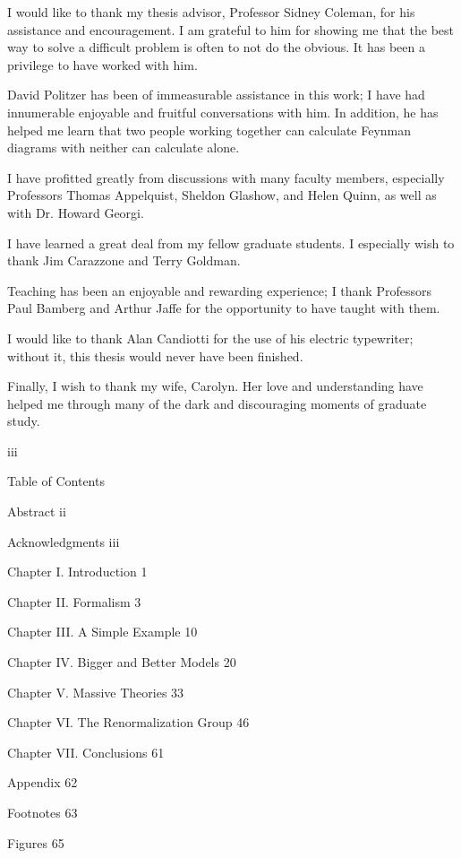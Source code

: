 \documentclass[12pt,epsf]{report}
\begin{document}
\bigskip


I would like to thank my thesis advisor, Professor Sidney Coleman, for
his assistance and encouragement.  I am grateful to him for showing 
me that the best way to solve a difficult problem is often to not do
the obvious.  It has been a privilege to have worked with him.

David Politzer has been of immeasurable assistance in this work; I have 
had innumerable enjoyable and fruitful conversations with him.  In 
addition, he has helped me learn that two people working together 
can calculate Feynman diagrams with neither can calculate alone.

I have profitted greatly from discussions with many faculty members,
especially Professors Thomas Appelquist, Sheldon Glashow, and Helen
Quinn, as well as with Dr. Howard Georgi.

I have learned a great deal from my fellow graduate students.  I 
especially wish to thank Jim Carazzone and Terry Goldman.  

Teaching has been an enjoyable and rewarding experience;
I thank Professors Paul Bamberg and Arthur Jaffe for the opportunity
to have taught with them.

I would like to thank Alan Candiotti for the use of his electric
typewriter; without it, this thesis would never have been finished.

Finally, I wish to thank my wife, Carolyn.  Her love and understanding
have helped me through many of the dark and discouraging moments of 
graduate study.

\thispagestyle{empty}

\vfill \centerline{iii}
\eject

\centerline{Table of Contents}

\bigskip

{\parindent =0pt
Abstract  \hfill  ii

Acknowledgments \hfill  iii 

Chapter I. Introduction  \hfill 1

Chapter II. Formalism \hfill 3

Chapter III. A Simple Example \hfill 10

Chapter IV. Bigger and Better Models \hfill 20

Chapter V. Massive Theories \hfill 33

Chapter VI. The Renormalization Group \hfill 46

Chapter VII. Conclusions \hfill 61

Appendix \hfill 62

Footnotes \hfill 63

Figures \hfill 65}
\end{document}
